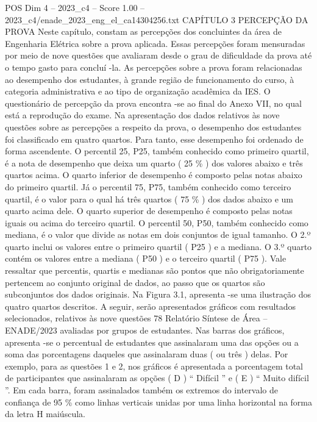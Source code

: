\begin{textsample}{POS Dim 4 – 2023\_c4 – Score 1.00 – 2023\_c4/enade\_2023\_eng\_el\_ca14304256.txt}  \label{ex:f4_pos_179}
CAPÍTULO 3 PERCEPÇÃO DA PROVA Neste capítulo, constam as percepções dos concluintes da área de Engenharia Elétrica sobre a prova aplicada.
Essas percepções foram mensuradas por meio de nove questões que avaliaram desde o grau de dificuldade da prova até o tempo gasto para concluí -la.
As percepções sobre a prova foram relacionadas ao desempenho dos estudantes, à grande região de funcionamento do curso, à categoria administrativa e ao tipo de organização acadêmica da IES.
O questionário de percepção da prova encontra -se ao final do Anexo VII, no qual está a reprodução do exame.
Na apresentação dos dados relativos às nove questões sobre as percepções a respeito da prova, o desempenho dos estudantes foi classificado em quatro quartos.
Para tanto, esse desempenho foi ordenado de forma ascendente.
O percentil 25, P25, também conhecido como primeiro quartil, é a nota de desempenho que deixa um quarto ( 25 \% ) dos valores abaixo e três quartos acima.
O quarto inferior de desempenho é composto pelas notas abaixo do primeiro quartil.
Já o percentil 75, P75, também conhecido como terceiro quartil, é o valor para o qual há três quartos ( 75 \% ) dos dados abaixo e um quarto acima dele.
O quarto superior de desempenho é composto pelas notas iguais ou acima do terceiro quartil.
O percentil 50, P50, também conhecido como mediana, é o valor que divide as notas em dois conjuntos de igual tamanho.
O 2.º quarto inclui os valores entre o primeiro quartil ( P25 ) e a mediana.
O 3.º quarto contém os valores entre a mediana ( P50 ) e o terceiro quartil ( P75 ).
Vale ressaltar que percentis, quartis e medianas são pontos que não obrigatoriamente pertencem ao conjunto original de dados, ao passo que os quartos são subconjuntos dos dados originais.
Na Figura 3.1, apresenta -se uma ilustração dos quatro quartos descritos.
A seguir, serão apresentados gráficos com resultados selecionados, relativos às nove questões 78 Relatório Síntese de Área – ENADE/2023 avaliadas por grupos de estudantes.
Nas barras dos gráficos, apresenta -se o percentual de estudantes que assinalaram uma das opções ou a soma das porcentagens daqueles que assinalaram duas ( ou três ) delas.
Por exemplo, para as questões 1 e 2, nos gráficos é apresentada a porcentagem total de participantes que assinalaram as opções ( D ) “ Difícil ” e ( E ) “ Muito difícil ”.
Em cada barra, foram assinalados também os extremos do intervalo de confiança de 95 \% como linhas verticais unidas por uma linha horizontal na forma da letra H maiúscula.

\end{textsample}
